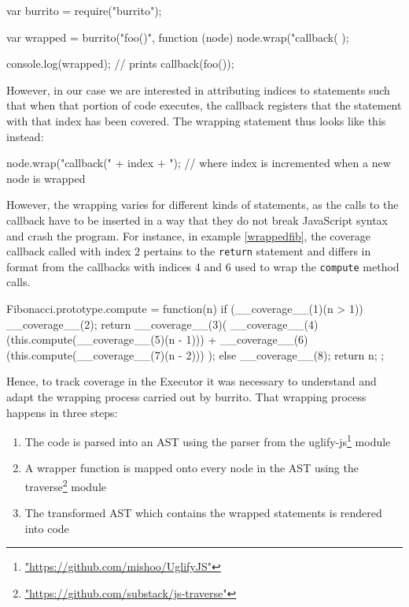 \begin{code}[caption=Wrapping with \textsf{burrito},label=burrito]
var burrito = require("burrito");

var wrapped = burrito("foo()", function (node) {
    node.wrap("callback(%
});

console.log(wrapped); // prints callback(foo());
\end{code}

However, in our case we are interested in attributing indices to statements such that when that portion of code executes, the callback registers that the statement with that index has been covered. The wrapping statement thus looks like this instead:

\begin{code}[caption=Wrapping in \textsf{Flycatcher}]
node.wrap("callback(" + index + "); %
// where index is incremented when a new node is wrapped
\end{code}

However, the wrapping varies for different kinds of statements, as the calls to the callback have to be inserted in a way that they do not break JavaScript syntax and crash the program. For instance, in example \ref{wrappedfib}, the coverage callback called with index 2 pertains to the \texttt{return} statement and differs in format from the callbacks with indices 4 and 6 used to wrap the \texttt{compute} method calls.

\begin{code}[caption=Wrapped Fibonacci,label=wrappedfib]
Fibonacci.prototype.compute = function(n) {
  if (__coverage__(1)(n > 1)) {
    __coverage__(2);
    return __coverage__(3)(
               __coverage__(4)(this.compute(__coverage__(5)(n - 1))) +
               __coverage__(6)(this.compute(__coverage__(7)(n - 2)))
           );
  } else {
    __coverage__(8);
    return n;
  }
};
\end{code}

Hence, to track coverage in the \textsf{Executor} it was necessary to understand and adapt the wrapping process carried out by \textsf{burrito}. That wrapping process happens in three steps:

\begin{enumerate}
   \item The code is parsed into an AST using the parser from the \textsf{uglify-js}\footnote{\url{"https://github.com/mishoo/UglifyJS"}} module
   \item A wrapper function is mapped onto every node in the AST using the \textsf{traverse}\footnote{\url{"https://github.com/substack/js-traverse"}} module
   \item The transformed AST which contains the wrapped statements is rendered into code
\end{enumerate}

